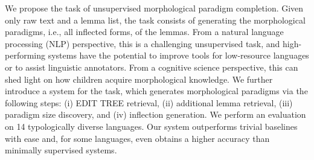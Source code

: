 We propose the task of unsupervised morphological paradigm completion. Given only raw text and a lemma list, the task consists of generating the morphological paradigms, i.e., all inflected forms, of the lemmas. From a natural language processing (NLP) perspective, this is a challenging unsupervised task, and high-performing systems have the potential to improve tools for low-resource languages or to assist linguistic annotators. From a cognitive science perspective, this can shed light on how children acquire morphological knowledge. We further introduce a system for the task, which generates morphological paradigms via the following steps: (i) EDIT TREE retrieval, (ii) additional lemma retrieval, (iii) paradigm size discovery, and (iv) inflection generation. We perform an evaluation on 14 typologically diverse languages. Our system outperforms trivial baselines with ease and, for some languages, even obtains a higher accuracy than minimally supervised systems.

